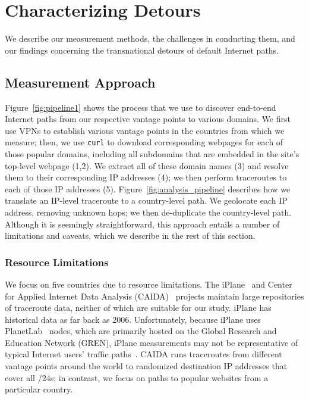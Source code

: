 \section{Characterizing Detours}
\label{datasets}
We  describe our measurement methods, the challenges in
conducting them, and our findings concerning the transnational detours
of default Internet paths.

\subsection{Measurement Approach}
\label{pipeline}

Figure~\ref{fig:pipeline1} shows the process that we use to discover end-to-end
Internet paths from our respective vantage points to various domains. We first use
VPNs
to establish various vantage points in the countries from which we measure; then,
we use
{\tt curl} to download corresponding webpages for each of those popular domains,
including all subdomains that are embedded in the site's top-level webpage (1,2). We extract
all of these domain names (3) and resolve them to their corresponding IP addresses (4);
we then perform traceroutes to each of those IP addresses (5).
Figure~\ref{fig:analysis_pipeline} describes how we translate an IP-level traceroute
to a country-level path. We geolocate each IP address, removing unknown hops; we
then de-duplicate the country-level path. Although it is seemingly straightforward,
this approach entails a number of limitations and caveats, which we describe in
the
rest of this section.

\subsubsection{Resource Limitations}
\label{resource_limits}

We focus on five countries due to resource limitations.
The iPlane~\cite{madhyastha2006iplane} and Center for Applied Internet Data
Analysis (CAIDA)~\cite{caida} projects maintain large repositories of
traceroute data, neither of which are suitable for our study.   iPlane has
historical data as far back as 2006. Unfortunately, because iPlane uses
PlanetLab~\cite{PlanetLab} nodes, which are primarily hosted on the Global
Research and Education Network (GREN), iPlane measurements may not be
representative of typical Internet users' traffic
paths~\cite{banerjee2004interdomain}.  CAIDA runs traceroutes from different
vantage points around the world to randomized destination IP addresses that
cover all /24s; in contrast, we focus on paths to popular websites from a
particular country.

